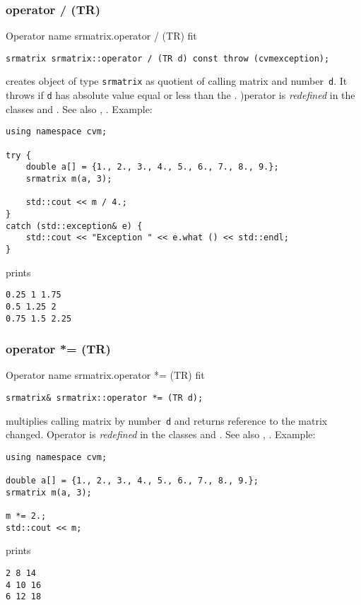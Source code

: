 \subsubsection{operator / (TR)}
Operator%
\pdfdest name {srmatrix.operator / (TR)} fit
\begin{verbatim}
srmatrix srmatrix::operator / (TR d) const throw (cvmexception);
\end{verbatim}
creates  object of type \verb"srmatrix" as  quotient of
 calling matrix and  number~\verb"d". It throws
if \verb"d" has  absolute value equal or less than the
.
)perator is \emph{redefined} in the classes
and .
See also ,
.
Example:
\begin{Verbatim}
using namespace cvm;

try {
    double a[] = {1., 2., 3., 4., 5., 6., 7., 8., 9.};
    srmatrix m(a, 3);

    std::cout << m / 4.;
}
catch (std::exception& e) {
    std::cout << "Exception " << e.what () << std::endl;
}
\end{Verbatim}
prints
\begin{Verbatim}
0.25 1 1.75
0.5 1.25 2
0.75 1.5 2.25
\end{Verbatim}
\newpage



\subsubsection{operator *= (TR)}
Operator%
\pdfdest name {srmatrix.operator *= (TR)} fit
\begin{verbatim}
srmatrix& srmatrix::operator *= (TR d);
\end{verbatim}
multiplies  calling matrix by  number~\verb"d"
and returns  reference to
the matrix changed.
Operator is \emph{redefined} in the classes
and .
See also ,
.
Example:
\begin{Verbatim}
using namespace cvm;

double a[] = {1., 2., 3., 4., 5., 6., 7., 8., 9.};
srmatrix m(a, 3);

m *= 2.;
std::cout << m;
\end{Verbatim}
prints
\begin{Verbatim}
2 8 14
4 10 16
6 12 18
\end{Verbatim}
\newpage




